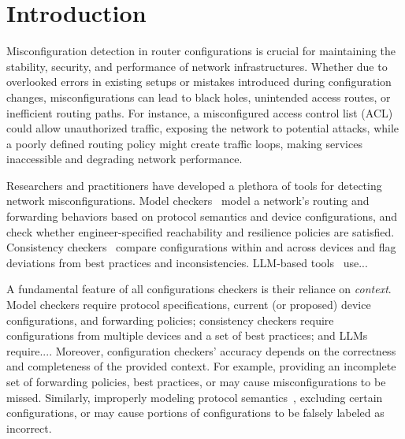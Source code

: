 
\section{Introduction}
\label{sec:intro}

Misconfiguration detection in router configurations is crucial for maintaining the stability, security, and performance of network infrastructures. Whether due to overlooked errors in existing setups or mistakes introduced during configuration changes, misconfigurations can lead to black holes, unintended access routes, or inefficient routing paths. %
For instance, a misconfigured access control list (ACL) could allow unauthorized traffic, exposing the network to potential attacks, while a poorly defined routing policy might create traffic loops, making services inaccessible and degrading network performance.

Researchers and practitioners have developed a plethora of tools for detecting network misconfigurations. Model checkers~\cite{fogel2015general, beckett2017general, abhashkumar2020tiramisu, prabhu2020plankton} model a network's routing and forwarding behaviors based on protocol semantics and device configurations, and check whether engineer-specified reachability and resilience policies are satisfied. Consistency checkers~\cite{kakarla2024diffy, kakarla2020finding, le2006minerals, feamster2005detecting} compare configurations within and across devices and flag deviations from best practices and inconsistencies. LLM-based tools~\cite{bogdanov2024leveraging,chen2024automatic,wang2024identifying,liu2024large, wang2024netconfeval, lian2023configuration} use... 

A fundamental feature of all configurations checkers is their reliance on {\em context}. Model checkers require protocol specifications, current (or proposed) device configurations, and forwarding policies; consistency checkers require configurations from multiple devices and a set of best practices; and LLMs require.... Moreover, configuration checkers' accuracy depends on the correctness and completeness of the provided context. For example, providing an incomplete set of forwarding policies, best practices, or  may cause misconfigurations to be missed. Similarly, improperly modeling protocol semantics~\cite{birkner2021metha}, excluding certain configurations, or  may cause portions of configurations to be falsely labeled as incorrect.

